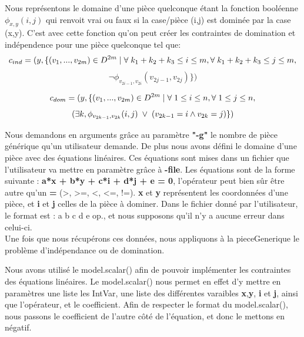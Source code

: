\documentclass{article}
\begin{document}
Nous représentons le domaine d'une pièce quelconque étant la fonction booléenne $\phi_{x,y} (i,j)$ qui
renvoit vrai ou faux si la case/pièce (i,j) est dominée par la case (x,y). C'est avec cette fonction
qu'on peut créer les contraintes de domination et indépendence pour une pièce quelconque tel que: \\

$$ c_{ind} = ( y, \{ (v_{1}, ..., v_{2m}) \in  D^{2m} \mid \forall \hspace{0.1cm} k_{1} + k_{2} + k_{3} \leq i \leq m, \forall \hspace{0.1cm} k_{1} + k_{2} + k_{3} \leq j \leq m,$$
$$ \neg \phi_ {v_{2i-1},v_{2i}} (v_{2j-1},v_{2j}) \} ) $$

$$ c_{dom} = ( y, \{ (v_{1}, ..., v_{2m}) \in  D^{2m} \mid \forall \hspace{0.1cm} 1\leq i \leq n, \forall \hspace{0.1cm} 1\leq j \leq n,$$
$$ (\exists k, \phi_{v_{2k-1},v_{2k}} (i,j) \hspace{0.1cm} \vee \hspace{0.1cm} (v_{2k-1} = i \wedge v_{2k} = j) \} ) $$


Nous demandons en arguments grâce au paramètre \textbf{"-g"} le nombre de pièce générique qu'un utilisateur demande. De plus nous avons défini le domaine d'une pièce avec des équations linéaires. Ces équations sont mises dans un fichier que l'utilisateur va mettre en paramètre grâce à \textbf{-file}. Les équations sont de la forme suivante : \textbf{a*x + b*y + c*i + d*j + e = 0}, l'opérateur peut bien sûr être autre qu'un \textbf{=} (>, >=, <, <=, !=). \textbf{x} et \textbf{y} représentent les coordonnées d'une pièce, et \textbf{i} et \textbf{j} celles de la pièce à dominer. Dans le fichier donné par l'utilisateur, le format est : a b c d e op., et nous supposons qu'il n'y a aucune erreur dans celui-ci. \\

Une fois que nous récupérons ces données, nous appliquons à la pieceGenerique le problème d'indépendance ou de domination. 

Nous avons utilisé le model.scalar() afin de pouvoir implémenter les contraintes des équations linéaires. Le model.scalar() nous permet en effet d'y mettre en paramètres une liste les IntVar, une liste des différentes varaibles \textbf{x},\textbf{y}, \textbf{i} et \textbf{j}, ainsi que l'opérateur, et le coefficient. Afin de respecter le format du model.scalar(), nous passons le coefficient de l'autre côté de l'équation, et donc le mettons en négatif.
	
\end{document}
